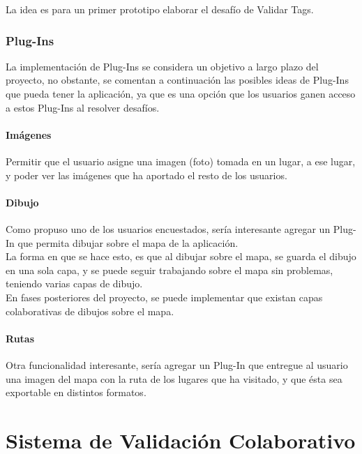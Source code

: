 \documentclass[10pt,letterpaper]{article}
\begin{document}
La idea es para un primer prototipo elaborar el desafío de Validar Tags.

\subsubsection{Plug-Ins}

La implementación de Plug-Ins se considera un objetivo a largo plazo del proyecto, no obstante, se comentan a continuación las posibles ideas de Plug-Ins que pueda tener la aplicación, ya que es una opción que los usuarios ganen acceso a estos Plug-Ins al resolver desafíos.

\paragraph{Imágenes}

Permitir que el usuario asigne una imagen (foto) tomada en un lugar, a ese lugar, y poder ver las imágenes que ha aportado el resto de los usuarios.\\

\paragraph{Dibujo}

Como propuso uno de los usuarios encuestados, sería interesante agregar un Plug-In que permita dibujar sobre el mapa de la aplicación.\\

La forma en que se hace esto, es que al dibujar sobre el mapa, se guarda el dibujo en una sola capa, y se puede seguir trabajando sobre el mapa sin problemas, teniendo varias capas de dibujo.\\

En fases posteriores del proyecto, se puede implementar que existan capas colaborativas de dibujos sobre el mapa.\\

\paragraph{Rutas}

Otra funcionalidad interesante, sería agregar un Plug-In que entregue al usuario una imagen del mapa con la ruta de los lugares que ha visitado, y que ésta sea exportable en distintos formatos.\\ 

\newpage
\section{Sistema de Validación Colaborativo}
\end{document}
